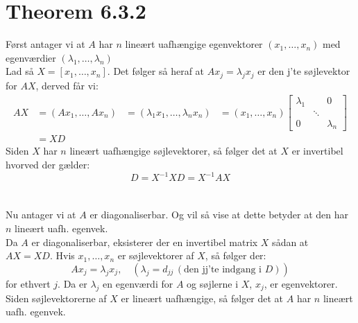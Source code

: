 \documentclass[a4paper,oneside,article]{memoir}
\begin{document}
	\section{Theorem 6.3.2}
	Først antager vi at $A$ har $n$ lineært uafhængige 
	egenvektorer $(x_1,\dots,x_n)$ med egenværdier 
	$(\lambda_1,\dots,\lambda_n)$\\
	Lad så $X=[x_1,\dots,x_n]$. Det følger så heraf at
	$Ax_j=\lambda_jx_j$ er den j'te søjlevektor for
	$AX$, derved får vi:
	\begin{align*}
	AX&=(Ax_1,\dots,Ax_n)
	&=(\lambda_1x_1,\dots,\lambda_nx_n)
	&=(x_1,\dots,x_n)\begin{bmatrix}
	\lambda_1 & & 0\\
	 & \ddots & \\
	 0 & & \lambda_n
	\end{bmatrix}\\
	&=XD
	\end{align*}
	Siden $X$ har $n$ lineært uafhængige søjlevektorer,
	så følger det at $X$ er invertibel hvorved der gælder:
	$$D=X^{-1}XD=X^{-1}AX$$
	\\
	\\
	Nu antager vi at $A$ er diagonaliserbar. Og vil så vise
	at dette betyder at den har $n$ lineært uafh. egenvek.\\
	Da $A$ er diagonaliserbar, eksisterer der en invertibel
	matrix $X$ sådan at $AX=XD$. Hvis $x_1,\dots,x_n$ er 
	søjlevektorer af $X$, så følger der:
	$$Ax_j=\lambda_j x_j, \quad (\lambda_j = d_{jj}\, (\text{den jj'te indgang i }D))$$
	for ethvert $j$. Da er $\lambda_j$ en egenværdi for $A$
	og søjlerne i $X$, $x_j$, er egenvektorer. Siden søjlevektorerne af $X$
	er lineært uafhængige, så følger det at $A$ har $n$ lineært
	uafh. egenvek.
\end{document}
